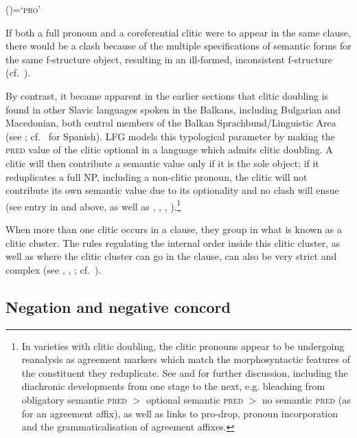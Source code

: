 \documentclass[output=paper,hidelinks]{langscibook}
\begin{document}
\ea\label{ex:Slavic:29} (\UP\PRED)=\textsc{`pro'}
    \z

If both a full pronoun and a coreferential clitic were to appear in the same clause, there would be a clash because of the multiple specifications of semantic forms for the same f-structure object, resulting in an ill-formed, inconsistent f-structure (cf.\ ). 

By contrast, it became apparent in the earlier sections that clitic doubling is found in other Slavic languages spoken in the Balkans, including Bulgarian and Macedonian, both central members of the Balkan Sprachbund/Linguistic Area (see \citealt{JaegerGerassimova2002}; cf.\  for Spanish).  LFG models this typological parameter by making the \textsc{pred} value of the clitic optional in a language which admits clitic doubling. A clitic will then contribute a semantic value only if it is the sole object; if it reduplicates a full NP, including a non-clitic pronoun, the clitic will not contribute its own semantic value due to its optionality and no clash will ensue (see entry in  and  above, as well as \citealt{FranksKing2000}, \citealt[105--106]{dalrymple01}, \citealt[357--358, 440]{BresnanEtAl2016}, \citealt[130--131, 152--153]{DLM:LFG}).\footnote{In varieties with clitic doubling, the clitic pronouns appear to be undergoing reanalysis as agreement markers which match the morphosyntactic features of the constituent they reduplicate. See \citet[Chapter 8]{BresnanEtAl2016} and  for further discussion, including the diachronic developments from one stage to the next, e.g. bleaching from obligatory semantic \textsc{pred} $>$ optional semantic \textsc{pred} $>$ no semantic \textsc{pred} (as for an agreement affix), as well as links to pro-drop, pronoun incorporation and the grammaticalisation of agreement affixes.}

When more than one clitic occurs in a clause, they group in what is known as a clitic cluster. The rules regulating the internal order inside this clitic cluster, as well as where the clitic cluster can go in the clause, can also be very strict and complex (see \citealt[234ff]{FranksKing2000}, \citealt[201]{JaegerGerassimova2002}, \citealt{boegel-etal2010}; cf.\ ).

\largerpage
\subsection{Negation and negative concord}
\label{sec:Slavic:2.9}
\end{document}
